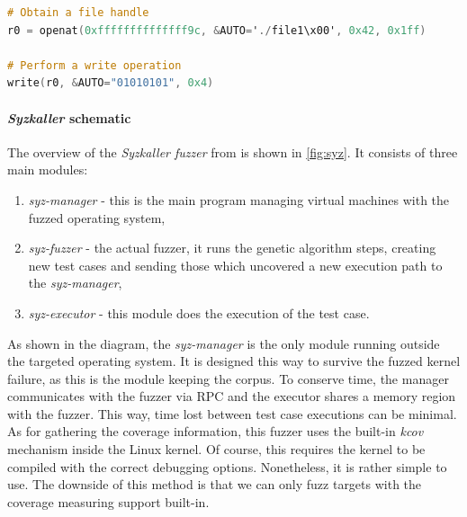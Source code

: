 \begin{minipage}\linewidth
    \begin{lstlisting}[language=C,caption={\textit{Syzkaller} DSL describing syscalls.},captionpos=b,label={lst:syzkaller_dsl}]
# Obtain a file handle
r0 = openat(0xffffffffffffff9c, &AUTO='./file1\x00', 0x42, 0x1ff)

# Perform a write operation
write(r0, &AUTO="01010101", 0x4)
    \end{lstlisting} 
\end{minipage}

\paragraph{\textit{Syzkaller} schematic}

The overview of the \textit{Syzkaller fuzzer} from \cite{syzkaller_repo} is shown in \ref{fig:syz}. It consists of three main modules:
\begin{enumerate}
    \item \textit{syz-manager} - this is the main program managing virtual machines with the fuzzed operating system,
    \item \textit{syz-fuzzer} - the actual fuzzer, it runs the genetic algorithm steps, creating new test cases and sending those which uncovered a new execution path to the \textit{syz-manager},
    \item \textit{syz-executor} - this module does the execution of the test case.
\end{enumerate}
As shown in the diagram, the \textit{syz-manager} is the only module running outside the targeted operating system. It is designed this way to survive the fuzzed kernel failure, as this is the module keeping the corpus. To conserve time, the manager communicates with the fuzzer via RPC and the executor shares a memory region with the fuzzer. This way, time lost between test case executions can be minimal. As for gathering the coverage information, this fuzzer uses the built-in \textit{kcov} mechanism inside the Linux kernel. Of course, this requires the kernel to be compiled with the correct debugging options. Nonetheless, it is rather simple to use. The downside of this method is that we can only fuzz targets with the coverage measuring support built-in.

